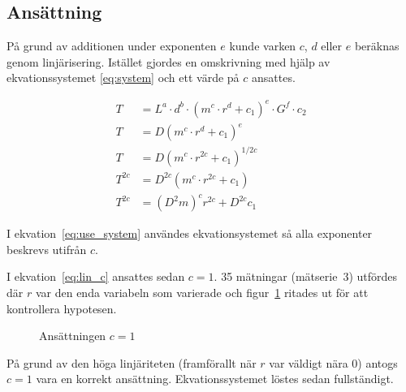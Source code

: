 \documentclass[a4paper,12pt]{article}
\begin{document}
\subsection{Ansättning}

På grund av additionen under exponenten $e$ kunde varken $c$, $d$ eller $e$
beräknas genom linjärisering. Istället gjordes en omskrivning med hjälp av
ekvationssystemet \eqref{eq:system} och ett värde på $c$ ansattes.

\begin{align}
  T &= L^a \cdot d^b \cdot (m^c \cdot r^d + c_1)^e \cdot G^f  \cdot c_2\nonumber \\
  T &= D (m^c \cdot r^d + c_1)^e \nonumber \\
  T &= D (m^c \cdot r^{2c} + c_1)^{1/2c} \label{eq:use_system} \\
  T^{2c} &= D^{2c} (m^c \cdot r^{2c} + c_1) \nonumber \\
  T^{2c} &= (D^2m)^c r^{2c} + D^{2c}c_1 \label{eq:lin_c}
\end{align}

I ekvation~\eqref{eq:use_system} användes ekvationsystemet så alla exponenter
beskrevs utifrån $c$.

I ekvation~\eqref{eq:lin_c} ansattes sedan $c = 1$. 35 mätningar (mätserie~3)
utfördes där $r$ var den enda variabeln som varierade och figur~\ref{fig:lin_c}
ritades ut för att kontrollera hypotesen.

\begin{figure}[h!]
  \caption{Ansättningen $c = 1$}
  \label{fig:lin_c}
\end{figure}

På grund av den höga linjäriteten (framförallt när $r$ var väldigt nära 0)
antogs $c = 1$ vara en korrekt ansättning. Ekvationssystemet löstes sedan
fullständigt.
\end{document}
